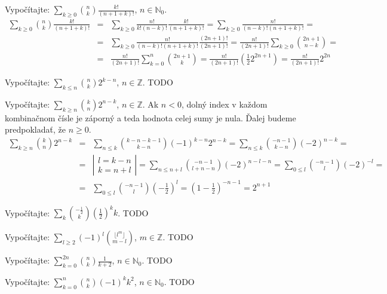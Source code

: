 
\pr Vypočítajte: $\sum_{k\geq0} {n \choose k}\frac{k!}{\left(n+1+k\right)!}$, $n\in \mathbb{N}_0$.
\begin{eqnarray*}
\sum_{k\geq0} {n \choose k}\frac{k!}{\left(n+1+k\right)!} &=& \sum_{k\geq0} \frac{n!}{k!\left(n-k\right)!}\frac{k!}{\left(n+1+k\right)!} = \sum_{k\geq0}\frac{n!}{\left(n-k\right)!\left(n+1+k\right)!} =\\
&=& \sum_{k\geq0}\frac{n!}{\left(n-k\right)!\left(n+1+k\right)!}\frac{\left(2n+1\right)!}{\left(2n+1\right)!} = \frac{n!}{\left(2n+1\right)!}\sum_{k\geq0} {2n+1 \choose n-k} =\\
&=& \frac{n!}{\left(2n+1\right)!}\sum_{k=0}^n {2n+1 \choose k} = \frac{n!}{\left(2n+1\right)!}\left(\frac12 2^{2n+1}\right) = \frac{n!}{\left(2n+1\right)!}2^{2n}
\end{eqnarray*}

\pr Vypočítajte: $\sum_{k \leq n}{n \choose k}2^{k-n}$, $n \in \mathbb{Z}$.
\ries{} TODO

\pr Vypočítajte: $\sum_{k \geq n}{k \choose n}2^{n-k}$, $n \in \mathbb{Z}$.
 Ak $n<0$, dolný index v každom kombinačnom čísle je záporný a teda hodnota celej sumy je nula. Ďalej budeme predpokladať, že $n\geq0$.
\begin{eqnarray*}
\sum_{k \geq n}{k \choose n}2^{n-k} &=& \sum_{n\leq k}{k-n-k-1 \choose k-n}\left(-1\right)^{k-n}2^{n-k} = \sum_{n\leq k}{-n-1 \choose k-n}\left(-2\right)^{n-k} = \\
&=& \left |\begin{array}{l}
l = k-n\\
k = n+l
\end{array}\right| = \sum_{n\leq n+l}{-n-1 \choose l+n-n}\left(-2\right)^{n-l-n} = \sum_{0 \leq l} {-n-1\choose l}\left(-2\right)^{-l} = \\
&=& \sum_{0\leq l}{-n-1 \choose l} \left(-\frac12\right)^l = \left(1 - \frac12\right)^{-n-1} = 2^{n+1}
\end{eqnarray*}

\pr Vypočítajte: $\sum_k{-\frac12 \choose k}\left(\frac12\right)^k k$.
\ries{} TODO

\pr Vypočítajte: $\sum_{l\geq 2}\left(-1\right)^l{\lfloor l^m \rfloor \choose m-l}$, $m\in\mathbb{Z}$.
\ries{} TODO

\pr Vypočítajte: $\sum_{k=0}^{2n}{n \choose k}\frac1{k+2}$, $n\in\mathbb{N}_0$.
\ries{} TODO

\pr Vypočítajte: $\sum_{k=0}^{n}{n \choose k}\left(-1\right)^k k^2$, $n\in\mathbb{N}_0$.
\ries{} TODO

